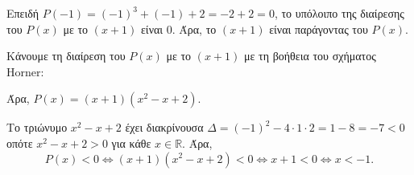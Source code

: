 \begin{alist}
\item 
\begin{rlist}
\item Επειδή $P(-1) = (-1)^3 + (-1) + 2 = -2 + 2 = 0$, το υπόλοιπο της διαίρεσης του $P(x)$ με το $(x + 1)$ είναι $0$. Άρα, το $(x + 1)$ είναι παράγοντας του $P(x)$.
\item Κάνουμε τη διαίρεση του $P(x)$ με το $(x + 1)$ με τη βοήθεια του σχήματος Horner:
\begin{center}
\end{center}
Άρα, $P(x) = (x + 1)(x^2 - x + 2)$.
\end{rlist}
\item Το τριώνυμο $x^2 - x + 2$ έχει διακρίνουσα $\Delta = (-1)^2 - 4\cdot 1\cdot 2 = 1 - 8 = -7 < 0$ οπότε $x^2 - x + 2 > 0$ για κάθε $x \in \mathbb{R}$. Άρα,
\[P(x) < 0 \Leftrightarrow (x + 1)(x^2 - x + 2) < 0 \Leftrightarrow x + 1 < 0 \Leftrightarrow x < -1.\]
\end{alist}

